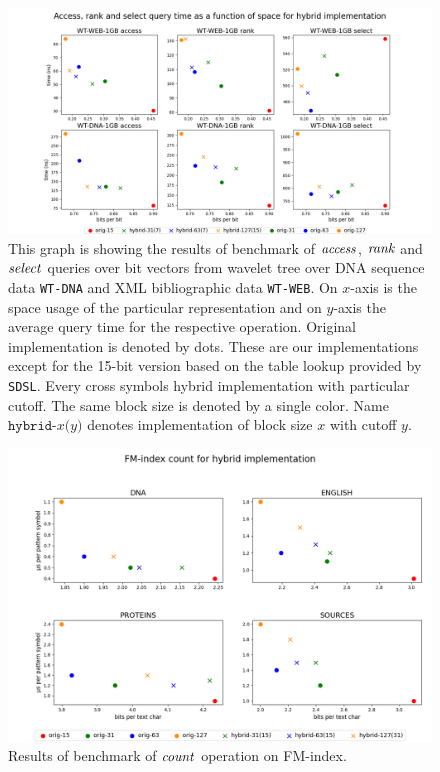 \begin{figure}
	\centerline{
		\includegraphics[width=\textwidth, height=0.35\textheight]{images/vysledky_sdsl_hybrid}
	}
	\caption[TODO]{This graph is showing the results of benchmark of $\mathit{access}$, $\mathit{rank}$ and $\mathit{select}$
	queries over bit vectors from wavelet tree over DNA sequence data \texttt{WT-DNA} and XML bibliographic
	data \texttt{WT-WEB}. On $x$-axis is the space usage of the particular representation and on $y$-axis
	the average query time for the respective operation. Original implementation is denoted by dots. These
	are our implementations except for the 15-bit version based on the table lookup provided by \texttt{SDSL}.
	Every cross symbols hybrid implementation with particular cutoff. The same block size is denoted by a
	single color. Name $\texttt{hybrid-}x\texttt{(}y\texttt{)}$ denotes implementation of block size $x$ with
	cutoff $y$.
	}
	\label{obr:vysledky_sdsl_hybrid}
\end{figure}

\begin{figure}
	\centerline{
		\includegraphics[width=\textwidth, height=0.5\textheight]{images/vysledky_sdsl_hybrid_count}
	}
	\caption[TODO]{Results of benchmark of $\mathit{count}$ operation on FM-index.
	}
	\label{obr:benchmark_sdsl_hybrid_count}
\end{figure}

